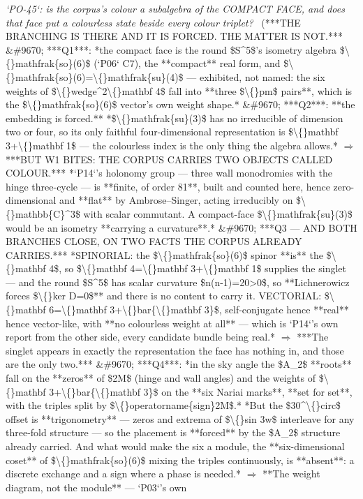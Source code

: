 \begin{description}
\textit{`PO-45`: is the corpus's colour a subalgebra of the COMPACT FACE, and does that face put a colourless state beside every colour triplet?} \ (***THE BRANCHING IS THERE AND IT IS FORCED. THE MATTER IS NOT.*** \&\#9670; ***Q1***: *the compact face is the round \$S\textasciicircum{}5\$'s isometry algebra \$\textbackslash\{\}mathfrak\{so\}(6)\$ (`P06` C7), the **compact** real form, and \$\textbackslash\{\}mathfrak\{so\}(6)=\textbackslash\{\}mathfrak\{su\}(4)\$ --- exhibited, not named: the six weights of \$\textbackslash\{\}wedge\textasciicircum{}2\textbackslash\{\}mathbf 4\$ fall into **three \$\textbackslash\{\}pm\$ pairs**, which is the \$\textbackslash\{\}mathfrak\{so\}(6)\$ vector's own weight shape.* \&\#9670; ***Q2***: **the embedding is forced.** *\$\textbackslash\{\}mathfrak\{su\}(3)\$ has no irreducible of dimension two or four, so its only faithful four-dimensional representation is \$\textbackslash\{\}mathbf 3+\textbackslash\{\}mathbf 1\$ --- the colourless index is the only thing the algebra allows.* \ensuremath{\Rightarrow}  ***BUT W1 BITES: THE CORPUS CARRIES TWO OBJECTS CALLED COLOUR.*** *`P14`'s holonomy group --- three wall monodromies with the hinge three-cycle --- is **finite, of order 81**, built and counted here, hence zero-dimensional and **flat** by Ambrose--Singer, acting irreducibly on \$\textbackslash\{\}mathbb\{C\}\textasciicircum{}3\$ with scalar commutant. A compact-face \$\textbackslash\{\}mathfrak\{su\}(3)\$ would be an isometry **carrying a curvature**.* \&\#9670; ***Q3 --- AND BOTH BRANCHES CLOSE, ON TWO FACTS THE CORPUS ALREADY CARRIES.*** *SPINORIAL: the \$\textbackslash\{\}mathfrak\{so\}(6)\$ spinor **is** the \$\textbackslash\{\}mathbf 4\$, so \$\textbackslash\{\}mathbf 4=\textbackslash\{\}mathbf 3+\textbackslash\{\}mathbf 1\$ supplies the singlet --- and the round \$S\textasciicircum{}5\$ has scalar curvature \$n(n-1)=20>0\$, so **Lichnerowicz forces \$\textbackslash\{\}ker D=0\$** and there is no content to carry it. VECTORIAL: \$\textbackslash\{\}mathbf 6=\textbackslash\{\}mathbf 3+\textbackslash\{\}bar\{\textbackslash\{\}mathbf 3\}\$, self-conjugate hence **real** hence vector-like, with **no colourless weight at all** --- which is `P14`'s own report from the other side, every candidate bundle being real.* \ensuremath{\Rightarrow} ***The singlet appears in exactly the representation the face has nothing in, and those are the only two.*** \&\#9670; ***Q4***: *in the sky angle the \$A\_2\$ **roots** fall on the **zeros** of \$2M\$ (hinge and wall angles) and the weights of \$\textbackslash\{\}mathbf 3+\textbackslash\{\}bar\{\textbackslash\{\}mathbf 3\}\$ on the **six Nariai marks**, **set for set**, with the triples split by \$\textbackslash\{\}operatorname\{sign\}2M\$.*  *But the \$30\textasciicircum{}\textbackslash\{\}circ\$ offset is **trigonometry** --- zeros and extrema of \$\textbackslash\{\}sin 3w\$ interleave for any three-fold structure --- so the placement is **forced** by the \$A\_2\$ structure already carried. And what would make the six a module, the **six-dimensional coset** of \$\textbackslash\{\}mathfrak\{so\}(6)\$ mixing the triples continuously, is **absent**: a discrete exchange and a sign where a phase is needed.* \ensuremath{\Rightarrow} **The weight diagram, not the module** --- `P03`'s own 
\end{description}
